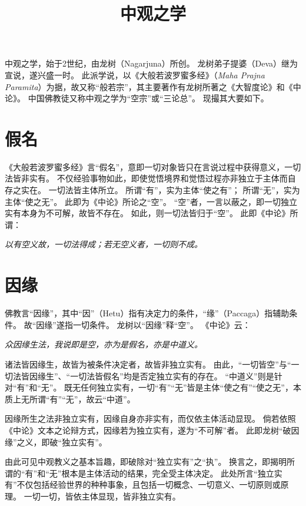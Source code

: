 \documentclass[11pt]{article}
\title{中观之学}
\date{}
\begin{document}
  \maketitle

  \linenumbers

中观之学，始于2世纪，由龙树（Nagarjuna）所创。
龙树弟子提婆（Deva）继为宣说，遂兴盛一时。
此派学说，以《大般若波罗蜜多经》（\textit{Maha Prajna Paramita}）为据，故又称“般若宗”，其主要著作有龙树所著之《大智度论》和《中论》。
中国佛教徒又称中观之学为“空宗”或“三论总”。
现撮其大要如下。

\section{假名}
《大般若波罗蜜多经》言“假名”，意即一切对象皆只在言说过程中获得意义，一切法皆非实有。
不仅经验事物如此，即使觉悟境界和觉悟过程亦非独立于主体而自存之实在。
一切法皆主体所立。
所谓“有”，实为主体“使之有”；
所谓“无”，实为主体“使之无”。
此即为《中论》所论之“空”。
“空”者，一言以蔽之，即一切独立实有本身为不可解，故皆不存在。
如此，则一切法皆归于“空”。
此即《中论》所谓：

\textit{以有空义故，一切法得成；若无空义者，一切则不成。}

\section{因缘}
佛教言“因缘”，其中“因”（Hetu）指有决定力的条件，“缘”（Paccaga）指辅助条件。
故“因缘”遂指一切条件。
龙树以“因缘”释“空”。
《中论》云：

\textit{众因缘生法，我说即是空，亦为是假名，亦是中道义。}

诸法皆因缘生，故皆为被条件决定者，故皆非独立实有。
由此，“一切皆空”与“一切法皆因缘生”、“一切法皆假名”均是否定独立实有的存在。
“中道义”则是针对“有”和“无”。
既无任何独立实有，一切“有”“无”皆是主体“使之有”“使之无”，本质上无所谓“有”“无”，故云“中道”。

\par

因缘所生之法非独立实有，因缘自身亦非实有，而仅依主体活动显现。
倘若依照《中论》文本之论辩方式，因缘若为独立实有，遂为“不可解”者。
此即龙树“破因缘”之义，即破“独立实有”。

\par

由此可见中观教义之基本旨趣，即破除对“独立实有”之“执”。
换言之，即揭明所谓的“有”和“无”根本是主体活动的结果，完全受主体决定。
此处所言“独立实有”不仅包括经验世界的种种事象，且包括一切概念、一切意义、一切原则或原理。
一切一切，皆依主体显现，皆非独立实有。
\end{document}
